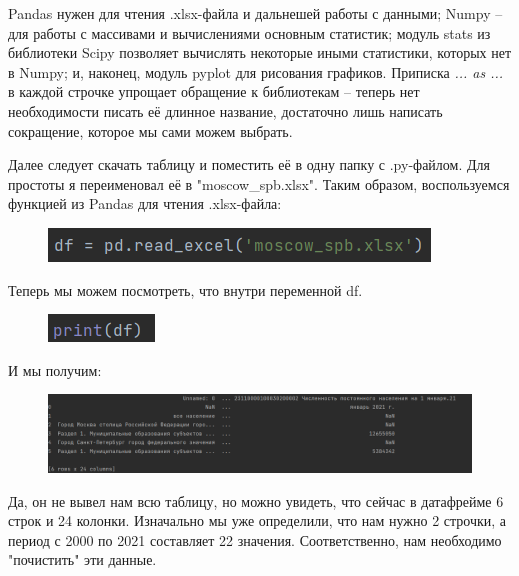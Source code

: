 Pandas нужен для чтения .xlsx-файла и дальнешей работы с данными; Numpy -- для работы с массивами и вычислениями основным статистик; модуль stats из библиотеки Scipy позволяет вычислять некоторые иными статистики, которых нет в Numpy; и, наконец, модуль pyplot для рисования графиков. Приписка \textit{... as ...} в каждой строчке упрощает обращение к библиотекам -- теперь нет необходимости писать её длинное название, достаточно лишь написать сокращение, которое мы сами можем выбрать.

Далее следует скачать таблицу и поместить её в одну папку с .py-файлом. Для простоты я переименовал её в "moscow\_spb.xlsx". Таким образом, воспользуемся функцией из Pandas для чтения .xlsx-файла:

\begin{figure}[H]
	\begin{center}
		\includegraphics{include/fig/readexcel}
	\end{center}
\end{figure}

Теперь мы можем посмотреть, что внутри переменной df.

\begin{figure}[H]
	\begin{center}
		\includegraphics{include/fig/printdf}
	\end{center}
\end{figure}

И мы получим:

\begin{figure}[H]
	\begin{center}
		\includegraphics[scale=0.65]{include/fig/print}
	\end{center}
\end{figure}

Да, он не вывел нам всю таблицу, но можно увидеть, что сейчас в датафрейме 6 строк и 24 колонки. Изначально мы уже определили, что нам нужно 2 строчки, а период с 2000 по 2021 составляет 22 значения. Соответственно, нам необходимо "почистить" эти данные.

